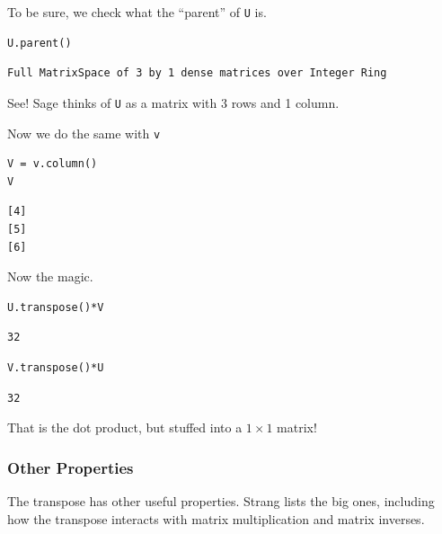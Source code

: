 \documentclass[10pt,]{book}
\theoremstyle{plain}
\theoremstyle{definition}
\numberwithin{equation}{section}
\begin{document}
        To be sure, we check what the ``parent'' of \verb?U? is.
\begin{lstlisting}[style=sageinput]
U.parent()
\end{lstlisting}
\begin{lstlisting}[style=sageoutput]
Full MatrixSpace of 3 by 1 dense matrices over Integer Ring
\end{lstlisting}
\par

        See! Sage thinks of \verb?U? as a matrix with 3 rows and 1 column.
\par

        Now we do the same with \verb?v?
\begin{lstlisting}[style=sageinput]
V = v.column()
V
\end{lstlisting}
\begin{lstlisting}[style=sageoutput]
[4]
[5]
[6]
\end{lstlisting}
\par

        Now the magic.
\begin{lstlisting}[style=sageinput]
U.transpose()*V
\end{lstlisting}
\begin{lstlisting}[style=sageoutput]
32
\end{lstlisting}
\begin{lstlisting}[style=sageinput]
V.transpose()*U
\end{lstlisting}
\begin{lstlisting}[style=sageoutput]
32
\end{lstlisting}
\par

        That is the dot product, but stuffed into a \(1\times 1\) matrix!
\typeout{************************************************}
\typeout{************************************************}
\subsubsection[Other Properties]{Other Properties}\label{subsubsection-33}

        The transpose has other useful properties. Strang lists the big ones,
        including how the transpose interacts with matrix multiplication and
        matrix inverses.
\typeout{************************************************}
\typeout{************************************************}
\end{document}
